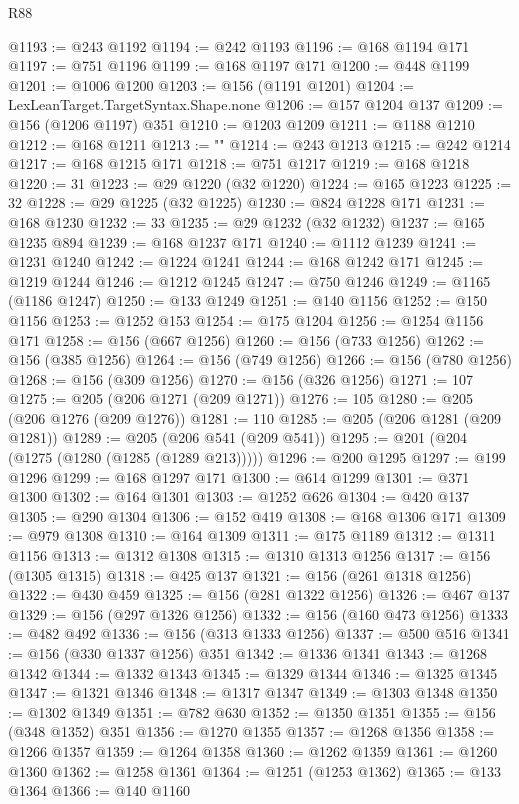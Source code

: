 \begin{lexlean}{R88}
\begin{coremodule}
{@1193 := @243 @1192
@1194 := @242 @1193
@1196 := @168 @1194 @171
@1197 := @751 @1196
@1199 := @168 @1197 @171
@1200 := @448 @1199
@1201 := @1006 @1200
@1203 := @156 (@1191 @1201)
@1204 := LexLeanTarget.TargetSyntax.Shape.none
@1206 := @157 @1204 @137
@1209 := @156 (@1206 @1197) @351
@1210 := @1203 @1209
@1211 := @1188 @1210
@1212 := @168 @1211
@1213 := "}"
@1214 := @243 @1213
@1215 := @242 @1214
@1217 := @168 @1215 @171
@1218 := @751 @1217
@1219 := @168 @1218
@1220 := 31
@1223 := @29 @1220 (@32 @1220)
@1224 := @165 @1223
@1225 := 32
@1228 := @29 @1225 (@32 @1225)
@1230 := @824 @1228 @171
@1231 := @168 @1230
@1232 := 33
@1235 := @29 @1232 (@32 @1232)
@1237 := @165 @1235 @894
@1239 := @168 @1237 @171
@1240 := @1112 @1239
@1241 := @1231 @1240
@1242 := @1224 @1241
@1244 := @168 @1242 @171
@1245 := @1219 @1244
@1246 := @1212 @1245
@1247 := @750 @1246
@1249 := @1165 (@1186 @1247)
@1250 := @133 @1249
@1251 := @140 @1156
@1252 := @150 @1156
@1253 := @1252 @153
@1254 := @175 @1204
@1256 := @1254 @1156 @171
@1258 := @156 (@667 @1256)
@1260 := @156 (@733 @1256)
@1262 := @156 (@385 @1256)
@1264 := @156 (@749 @1256)
@1266 := @156 (@780 @1256)
@1268 := @156 (@309 @1256)
@1270 := @156 (@326 @1256)
@1271 := 107
@1275 := @205 (@206 @1271 (@209 @1271))
@1276 := 105
@1280 := @205 (@206 @1276 (@209 @1276))
@1281 := 110
@1285 := @205 (@206 @1281 (@209 @1281))
@1289 := @205 (@206 @541 (@209 @541))
@1295 := @201 (@204 (@1275 (@1280 (@1285 (@1289 @213)))))
@1296 := @200 @1295
@1297 := @199 @1296
@1299 := @168 @1297 @171
@1300 := @614 @1299
@1301 := @371 @1300
@1302 := @164 @1301
@1303 := @1252 @626
@1304 := @420 @137
@1305 := @290 @1304
@1306 := @152 @419
@1308 := @168 @1306 @171
@1309 := @979 @1308
@1310 := @164 @1309
@1311 := @175 @1189
@1312 := @1311 @1156
@1313 := @1312 @1308
@1315 := @1310 @1313 @1256
@1317 := @156 (@1305 @1315)
@1318 := @425 @137
@1321 := @156 (@261 @1318 @1256)
@1322 := @430 @459
@1325 := @156 (@281 @1322 @1256)
@1326 := @467 @137
@1329 := @156 (@297 @1326 @1256)
@1332 := @156 (@160 @473 @1256)
@1333 := @482 @492
@1336 := @156 (@313 @1333 @1256)
@1337 := @500 @516
@1341 := @156 (@330 @1337 @1256) @351
@1342 := @1336 @1341
@1343 := @1268 @1342
@1344 := @1332 @1343
@1345 := @1329 @1344
@1346 := @1325 @1345
@1347 := @1321 @1346
@1348 := @1317 @1347
@1349 := @1303 @1348
@1350 := @1302 @1349
@1351 := @782 @630
@1352 := @1350 @1351
@1355 := @156 (@348 @1352) @351
@1356 := @1270 @1355
@1357 := @1268 @1356
@1358 := @1266 @1357
@1359 := @1264 @1358
@1360 := @1262 @1359
@1361 := @1260 @1360
@1362 := @1258 @1361
@1364 := @1251 (@1253 @1362)
@1365 := @133 @1364
@1366 := @140 @1160

\end{coremodule}
\end{lexlean}
